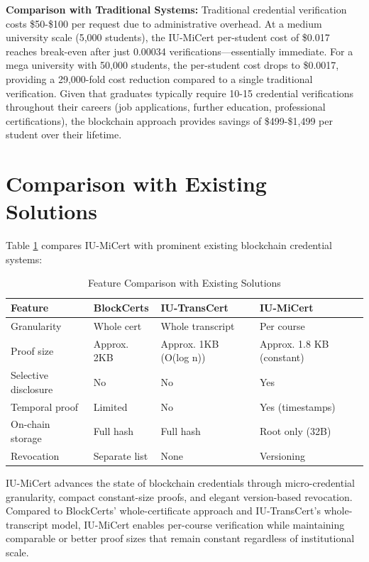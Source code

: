 \textbf{Comparison with Traditional Systems:} Traditional credential verification costs \$50-\$100 per request due to administrative overhead. At a medium university scale (5,000 students), the IU-MiCert per-student cost of \$0.017 reaches break-even after just 0.00034 verifications—essentially immediate. For a mega university with 50,000 students, the per-student cost drops to \$0.0017, providing a 29,000-fold cost reduction compared to a single traditional verification. Given that graduates typically require 10-15 credential verifications throughout their careers (job applications, further education, professional certifications), the blockchain approach provides savings of \$499-\$1,499 per student over their lifetime.

\section{Comparison with Existing Solutions}
\label{sec:solution-comparison}

Table \ref{tab:solution-comparison} compares IU-MiCert with prominent existing blockchain credential systems:

\begin{table}[H]
\centering
\caption{Feature Comparison with Existing Solutions}
\label{tab:solution-comparison}
\begin{tabular}{|p{3.5cm}|p{2.5cm}|p{3cm}|p{3cm}|}
\hline
\textbf{Feature} & \textbf{BlockCerts} & \textbf{IU-TransCert} & \textbf{IU-MiCert} \\
\hline
Granularity & Whole cert & Whole transcript & Per course \\
\hline
Proof size & Approx. 2KB & Approx. 1KB (O(log n)) & Approx. 1.8 KB (constant) \\
\hline
Selective disclosure & No & No & Yes \\
\hline
Temporal proof & Limited & No & Yes (timestamps) \\
\hline
On-chain storage & Full hash & Full hash & Root only (32B) \\
\hline
Revocation & Separate list & None & Versioning \\
\hline
\end{tabular}
\end{table}

IU-MiCert advances the state of blockchain credentials \cite{blockcerts_mit, le_iutranscert, nguyen2024iuvec} through micro-credential granularity, compact constant-size proofs, and elegant version-based revocation. Compared to BlockCerts' whole-certificate approach and IU-TransCert's whole-transcript model, IU-MiCert enables per-course verification while maintaining comparable or better proof sizes that remain constant regardless of institutional scale.

